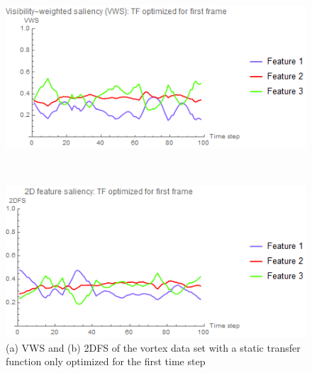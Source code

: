 \begin{figure}
	\centering
	\begin{minipage}{.5\textwidth}
		\includegraphics[width=1\linewidth]{images/vorts_static_VWS}
		\subcaption{}
	\end{minipage}~
	\begin{minipage}{.5\textwidth}
		\includegraphics[width=1\linewidth]{images/vorts_static_2DFS}
		\subcaption{}
	\end{minipage}
	\caption{(a) VWS and (b) 2DFS of the vortex data set with a static transfer function only optimized for the first time step}
	\label{fig:vorts_static}
\end{figure}

